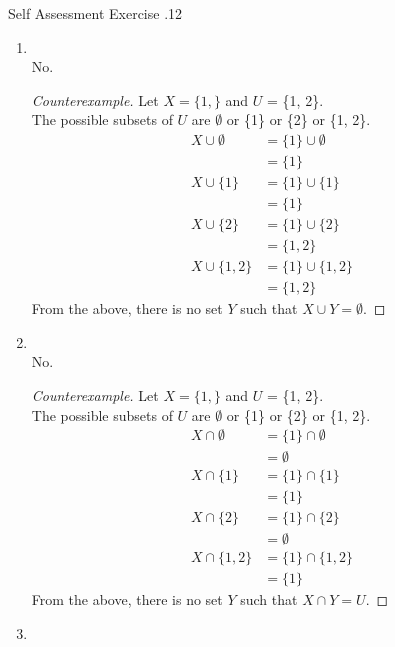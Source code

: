 \documentclass[../notes.tex]{subfiles}
\begin{document}
\begin{exercise}{Self Assessment Exercise \thechapter.12}
\begin{enumerate}
					\pagebreak
					\item {}\\
						No.
						\begin{proof}[Counterexample]
							Let $X = \{1,\}$ and $U$ = \{1, 2\}.\\
							The possible subsets of $U$ are $\emptyset$ or \{1\} or \{2\} or \{1, 2\}.
							\begin{align*}
								X \cup \emptyset &= \{1\} \cup \emptyset\\
								&= \{1\}\\
								X \cup \{1\} &= \{1\} \cup \{1\}\\
								&= \{1\}\\
								X \cup \{2\} &= \{1\} \cup \{2\}\\
								&= \{1, 2\}\\
								X \cup \{1, 2\} &= \{1\} \cup \{1, 2\}\\
								&= \{1, 2\}
							\end{align*}
							From the above, there is no set $Y$ such that $X \cup Y = \emptyset$.
						\end{proof}
					\item {}\\
						No.
						\begin{proof}[Counterexample]
							Let $X = \{1,\}$ and $U$ = \{1, 2\}.\\
							The possible subsets of $U$ are $\emptyset$ or \{1\} or \{2\} or \{1, 2\}.
							\begin{align*}
								X \cap \emptyset &= \{1\} \cap \emptyset\\
								&= \emptyset\\
								X \cap \{1\} &= \{1\} \cap \{1\}\\
								&= \{1\}\\
								X \cap \{2\} &= \{1\} \cap \{2\}\\
								&= \emptyset\\
								X \cap \{1, 2\} &= \{1\} \cap \{1, 2\}\\
								&= \{1\}
							\end{align*}
							From the above, there is no set $Y$ such that $X \cap Y = U$.
						\end{proof}
					\item {}

\end{enumerate}
\end{exercise}
\end{document}
